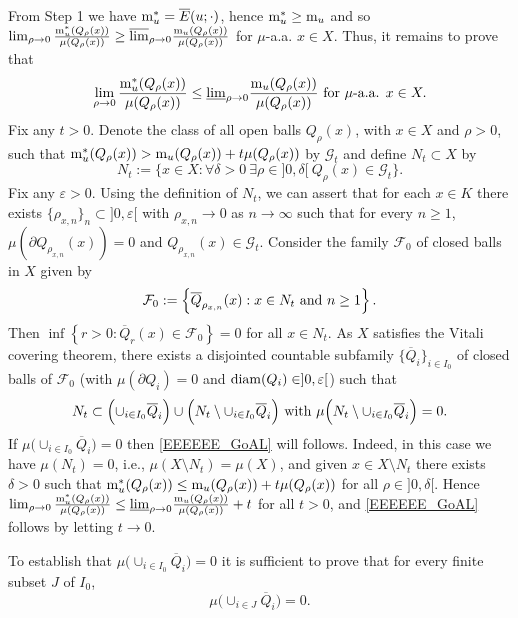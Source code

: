 \documentclass[10pt]{amsart}
\numberwithin{equation}{section}
\theoremstyle{definition}
\theoremstyle{remark}
\begin{document}
From Step 1 we have ${\rm m}_u^*=\overline{E}(u;\cdot)$, hence ${\rm m}^*_u\geq{\rm m}_u$ and so $\lim_{\rho\to0}{{\rm m}^*_u(Q_\rho(x))\over\mu(Q_\rho(x))}\geq{\mathop{\overline{\lim}}}_{\rho\to 0}{{\rm m}_u(Q_\rho(x))\over\mu(Q_\rho(x))}$ for $\mu$-a.a. $x\in X$. Thus, it remains to prove that
\begin{equation}\label{EEEEEE_GoAL}
\lim_{\rho\to 0}{{\rm m}^*_u(Q_\rho(x))\over\mu(Q_\rho(x))}\leq{\mathop{\underline{\lim}}}_{\rho\to 0}{{\rm m}_u(Q_\rho(x))\over\mu(Q_\rho(x))}\hbox{ for }\mu\hbox{-a.a. }x\in X.
\end{equation}
Fix any $t>0$. Denote the class of all open balls $Q_\rho(x)$, with $x\in X$ and $\rho>0$, such that ${\rm m}^*_u(Q_{\rho}(x))>{\rm m}_u(Q_{\rho}(x))+t\mu(Q_{\rho}(x))$ by $\mathcal{G}_t$ and define $N_t\subset X$ by
$$
N_t:=\Big\{x\in X:\forall\delta>0\ \exists\rho\in]0,\delta[\ Q_\rho(x)\in\mathcal{G}_t\Big\}.
$$
Fix any ${\varepsilon}>0$. Using the definition of $N_t$, we can assert that for each $x\in K$ there exists $\{\rho_{x,n}\}_n\subset]0,{\varepsilon}[$ with $\rho_{x,n}\to0$ as $n\to\infty$ such that for every $n\geq 1$, $\mu(\partial Q_{\rho_{x,n}}(x))=0$ and $Q_{\rho_{x,n}}(x)\in\mathcal{G}_t$. Consider the family $\mathcal{F}_0$ of closed balls in $X$ given by
$$
\mathcal{F}_0:=\left\{\overline{Q}_{\rho_{x,n}}(x):x\in N_t\hbox{ and }n\geq 1\right\}.
$$
Then $\inf\left\{r>0:\overline{Q}_r(x)\in\mathcal{F}_0\right\}=0$ for all $x\in N_t$. As $X$ satisfies the Vitali covering theorem, there exists a disjointed countable subfamily $\{\overline{Q}_i\}_{i\in I_0}$ of closed balls of $\mathcal{F}_0$ (with $\mu(\partial Q_i)=0$ and ${\rm diam}(Q_i)\in]0,{\varepsilon}[$) such that
$$
N_t\subset\Big({\mathop{\cup}}_{i\in I_0}\overline{Q}_i\Big)\cup\Big(N_t\setminus{\mathop{\cup}}_{i\in I_0}\overline{Q}_i\Big)\hbox{ with }\mu\Big(N_t\setminus{\mathop{\cup}}_{i\in I_0}\overline{Q}_i\Big)=0. 
$$
If $\mu\big(\cup_{i\in I_0}\overline{Q}_i\big)=0$ then \eqref{EEEEEE_GoAL} will follows. Indeed, in this case we have $\mu(N_t)=0$, i.e., $\mu(X\setminus N_t)=\mu(X)$, and given $x\in X\setminus N_t$ there exists $\delta>0$ such that ${\rm m}^*_u(Q_{\rho}(x))\leq{\rm m}_u(Q_{\rho}(x))+t\mu(Q_{\rho}(x))$ for all $\rho\in]0,\delta[$. Hence $\lim_{\rho\to0}{{\rm m}^*_u(Q_\rho(x))\over\mu(Q_\rho(x))}\leq{\mathop{\underline{\lim}}}_{\rho\to0}{{\rm m}_u(Q_\rho(x))\over\mu(Q_\rho(x))}+t$ for all $t>0$, and \eqref{EEEEEE_GoAL} follows by letting $t\to0$. 

To establish that $\mu\big({\mathop{\cup}}_{i\in I_0}\overline{Q}_i\big)=0$ it is sufficient to prove that for every finite subset $J$ of $I_0$,
\begin{equation}\label{GoAl-PPPRRRoooFFF}
\mu\Big({\mathop{\cup}}_{i\in J}\overline{Q}_i\Big)=0.
\end{equation} 
\end{document}
